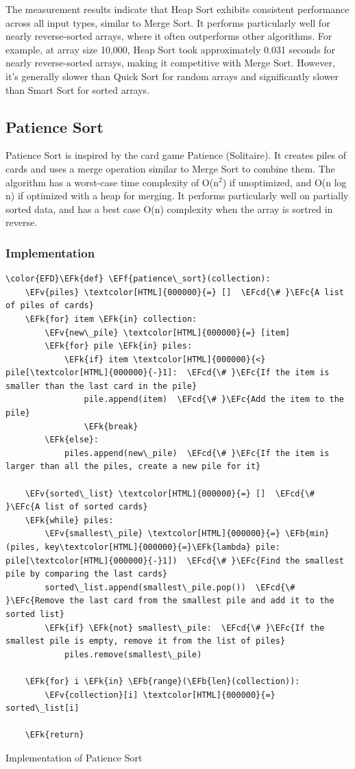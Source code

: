 \documentclass[a4paper,12pt]{article}
\newcommand{\EFc}[1]{\textcolor{EFc}{#1}} %
\newcommand{\EFcd}[1]{\textcolor{EFcd}{#1}} %
\newcommand{\EFk}[1]{\textcolor{EFk}{#1}} %
\newcommand{\EFb}[1]{\textcolor{EFb}{#1}} %
\newcommand{\EFf}[1]{\textcolor{EFf}{#1}} %
\newcommand{\EFv}[1]{\textcolor{EFv}{#1}} %
\begin{document}
The measurement results indicate that Heap Sort exhibits consistent performance across all input types, similar to Merge Sort. It performs particularly well for nearly reverse-sorted arrays, where it often outperforms other algorithms. For example, at array size 10,000, Heap Sort took approximately 0.031 seconds for nearly reverse-sorted arrays, making it competitive with Merge Sort. However, it's generally slower than Quick Sort for random arrays and significantly slower than Smart Sort for sorted arrays.
\subsection{Patience Sort}
\label{sec:orgb896780}
Patience Sort is inspired by the card game Patience (Solitaire). It creates piles of cards and uses a merge operation similar to Merge Sort to combine them. The algorithm has a worst-case time complexity of O(n\(^{2}\)) if unoptimized, and  O(n log n) if optimized with a heap for merging. It performs particularly well on partially sorted data, and has a best case O(n) complexity when the array is sortred in reverse.
\subsubsection{Implementation}
\label{sec:orgbbf4209}
\begin{listing}[htbp]
\begin{Code}
\begin{Verbatim}
\color{EFD}\EFk{def} \EFf{patience\_sort}(collection):
    \EFv{piles} \textcolor[HTML]{000000}{=} []  \EFcd{\# }\EFc{A list of piles of cards}
    \EFk{for} item \EFk{in} collection:
        \EFv{new\_pile} \textcolor[HTML]{000000}{=} [item]
        \EFk{for} pile \EFk{in} piles:
            \EFk{if} item \textcolor[HTML]{000000}{<} pile[\textcolor[HTML]{000000}{-}1]:  \EFcd{\# }\EFc{If the item is smaller than the last card in the pile}
                pile.append(item)  \EFcd{\# }\EFc{Add the item to the pile}
                \EFk{break}
        \EFk{else}:
            piles.append(new\_pile)  \EFcd{\# }\EFc{If the item is larger than all the piles, create a new pile for it}

    \EFv{sorted\_list} \textcolor[HTML]{000000}{=} []  \EFcd{\# }\EFc{A list of sorted cards}
    \EFk{while} piles:
        \EFv{smallest\_pile} \textcolor[HTML]{000000}{=} \EFb{min}(piles, key\textcolor[HTML]{000000}{=}\EFk{lambda} pile: pile[\textcolor[HTML]{000000}{-}1])  \EFcd{\# }\EFc{Find the smallest pile by comparing the last cards}
        sorted\_list.append(smallest\_pile.pop())  \EFcd{\# }\EFc{Remove the last card from the smallest pile and add it to the sorted list}
        \EFk{if} \EFk{not} smallest\_pile:  \EFcd{\# }\EFc{If the smallest pile is empty, remove it from the list of piles}
            piles.remove(smallest\_pile)

    \EFk{for} i \EFk{in} \EFb{range}(\EFb{len}(collection)):
        \EFv{collection}[i] \textcolor[HTML]{000000}{=} sorted\_list[i]

    \EFk{return}
\end{Verbatim}
\end{Code}
\caption{\label{lst:orgfa49fb2}Implementation of Patience Sort}
\end{listing}
\end{document}

